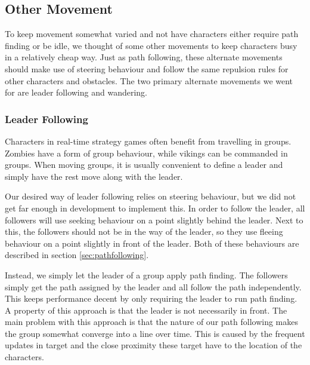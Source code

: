 \subsection{Other Movement}
To keep movement somewhat varied and not have characters either require path finding or be idle, we thought of some other movements to keep characters busy in a relatively cheap way. Just as path following, these alternate movements should make use of steering behaviour and follow the same repulsion rules for other characters and obstacles. The two primary alternate movements we went for are leader following and wandering.

\subsubsection{Leader Following}
Characters in real-time strategy games often benefit from travelling in groups. Zombies have a form of group behaviour, while vikings can be commanded in groups. When moving groups, it is usually convenient to define a leader and simply have the rest move along with the leader.

Our desired way of leader following relies on steering behaviour, but we did not get far enough in development to implement this. In order to follow the leader, all followers will use seeking behaviour on a point slightly behind the leader. Next to this, the followers should not be in the way of the leader, so they use fleeing behaviour on a point slightly in front of the leader. Both of these behaviours are described in section \ref{sec:pathfollowing}.

Instead, we simply let the leader of a group apply path finding. The followers simply get the path assigned by the leader and all follow the path independently. This keeps performance decent by only requiring the leader to run path finding. A property of this approach is that the leader is not necessarily in front. The main problem with this approach is that the nature of our path following makes the group somewhat converge into a line over time. This is caused by the frequent updates in target and the close proximity these target have to the location of the characters.

